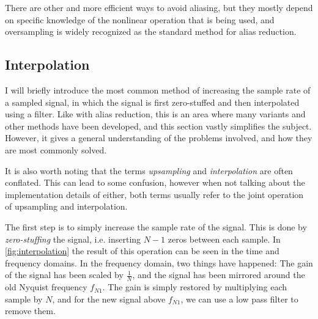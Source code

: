 There are other and more efficient ways to avoid aliasing\autocite{7865908}, but they mostly depend on
specific knowledge of the nonlinear operation that is being used, and oversampling is widely recognized as
the standard method for alias reduction\autocite{kahles2019oversampling, deman2014}.

\subsection{Interpolation}
\label{sec:interpolation}

I will briefly introduce the most common method of increasing the sample rate of a sampled signal, in which
the signal is first zero-stuffed and then interpolated using a filter. Like with alias reduction, this is an
area where many variants and other methods have been developed\autocite{SORIA2013, castillocomparative}, and this section vastly
simplifies the subject. However, it gives a general understanding of the problems involved, and how they are
most commonly solved.

It is also worth noting that the terms \emph{upsampling} and \emph{interpolation} are often conflated.
This can lead to some confusion, however when not talking about the implementation details of either, both
terms usually refer to the joint operation of upsampling and interpolation.

The first step is to simply increase the sample rate of the signal. This is done by \emph{zero-stuffing}
the signal, i.e. inserting $N - 1$ zeros between each sample. In \autoref{fig:interpolation} the
result of this operation can be seen in the time and frequency domains. In the frequency domain, two things
have happened: The gain of the signal has been scaled by $\frac{1}{N}$, and the signal has been
mirrored around the old Nyquist frequency $f_{N1}$. The gain is simply restored by multiplying
each sample by $N$, and for the new signal above $f_{N1}$, we can use a low
pass filter to remove them.

